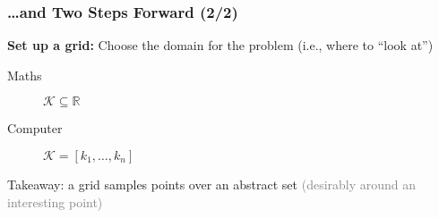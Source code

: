 \documentclass[10pt, aspectratio=1610, handout]{beamer}
\begin{document}
  \begin{frame}
    \frametitle{\dots and Two Steps Forward (2/2)}  \label{sld:grid}

    \textbf{Set up a grid:} Choose the domain for the problem (i.e., where to ``look at'')

    \vfill\pause

    \begin{description}
      \item[Maths] $\mathcal{K} \subseteq \mathbb{R}$
      \item[Computer] $\mathcal{K} = [k_1, \ldots, k_n]$
    \end{description}

    \vfill\pause

    \begin{figure}
      \centering
    \end{figure}

    \vfill\pause

    Takeaway: a grid samples points over an abstract set \hfill \textcolor{gray}{(desirably around an interesting point)}

    \vfill

    \hfill {}

  \end{frame}
\end{document}
